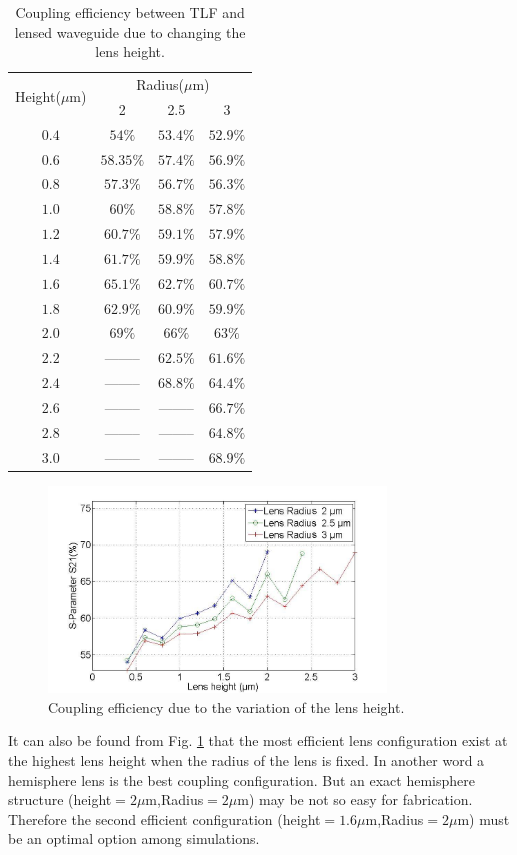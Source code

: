 \begin{table}
\caption{Coupling efficiency between TLF and lensed waveguide due to changing the lens height.}
\centering
\begin{tabular}{|c|c|c|c|}
\hline
\multirow{2}{*}{Height($\mu$m)}&\multicolumn{3}{c|}{Radius($\mu$m)}\\
\cline{2-4}
 			&	2&	2.5&	3\\
\hline
$0.4$&$54\%$&$53.4\%$&$52.9\%$\\
$0.6$&$58.35\%$&$57.4\%$&$56.9\%$\\
$0.8$&$57.3\%$&$56.7\%$&$56.3\%$\\
$1.0$&$60\%$&$58.8\%$&$57.8\%$\\
$1.2$&$60.7\%$&$59.1\%$&$57.9\%$\\
$1.4$&$61.7\%$&$59.9\%$&$58.8\%$\\
$1.6$&$65.1\%$&$62.7\%$&$60.7\%$\\
$1.8$&$62.9\%$&$60.9\%$&$59.9\%$\\
$2.0$&$69\%$  &  $66\%$&$63\%$\\
$2.2$&--------&$62.5\%$&$61.6\%$\\
$2.4$&--------&$68.8\%$&$64.4\%$\\
$2.6$&--------&--------&$66.7\%$\\
$2.8$&--------&--------&$64.8\%$\\
$3.0$&--------&--------&$68.9\%$\\
\hline
\end{tabular}
\label{tab:coupling_lensed_waveguide_height}
\end{table}
\begin{figure}[!ht]
\centering
\includegraphics[width=0.8\textwidth]{bilder/s21_fix_lens_radium_hxx}
\caption{Coupling efficiency due to the variation of the lens height.}
\label{fig:coupling_lenses_curve_hxx}
\end{figure}
It can also be found from Fig. \ref{fig:coupling_lenses_curve_hxx} that the most efficient lens configuration exist at the highest lens height when the radius of the lens is fixed. In another word a hemisphere lens is the best coupling configuration. But an exact hemisphere structure (height$=2\mu$m,Radius$=2\mu$m) may be not so easy for fabrication. Therefore the second efficient configuration (height$=1.6\mu$m,Radius$=2\mu$m) must be  an optimal option among simulations.\\ 

